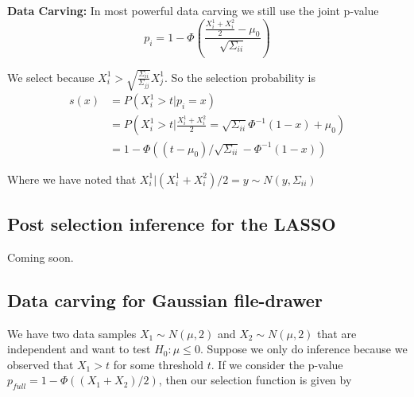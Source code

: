 \documentclass{article}
\begin{document}
\begin{appendix}
\textbf{Data Carving: } In most powerful data carving we still use the joint p-value 
\begin{equation*}
    p_i = 1 - \Phi\left( \frac{ \frac{X_i^1 + X_i^2}{2} - \mu_0}{\sqrt{\Sigma_{ii}}} \right) 
\end{equation*}

We select because $X^1_i > \sqrt{\frac{\Sigma_{ii}}{\Sigma_{jj}}} X^1_j$. So the selection probability is 
\begin{align*}
    s(x) &= P( X^1_i > t | p_i = x ) \\
         &=  P( X^1_i > t | \frac{X^1_i + X^2_i}{2} =  \sqrt{\Sigma_{ii}}\Phi^{-1}(1 -x) + \mu_0 )\\
         &= 1 - \Phi((t - \mu_0)/\sqrt{\Sigma_{ii}} - \Phi^{-1}(1 - x))
\end{align*}

Where we have noted that $X_i^1 |  (X_i^1 + X_i^2)/2 = y \sim N(y, \Sigma_{ii})$ 
\fi 

\subsection{Post selection inference for the LASSO}
\label{sec:lasso_appdx}

Coming soon. 

\subsection{Data carving for Gaussian file-drawer}
\label{sec:carve_appdx}

We have two data samples $X_1 \sim N(\mu, 2)$ and $X_2 \sim N(\mu, 2)$ that are independent and want to test $H_0 : \mu \leq 0$. Suppose we only do inference because we observed that $X_1  > t$ for some threshold $t$. If we consider the p-value $p_{full} = 1 - \Phi((X_1 + X_2)/2  )$, then our selection function is given by 


\end{appendix}
\end{document}
